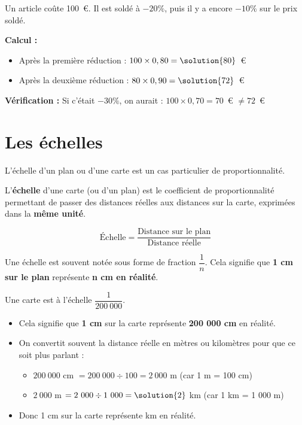 \begin{examplebox}
	Un article coûte 100~€. Il est soldé à $-20\%$, puis il y a encore $-10\%$ sur le prix soldé.

	\textbf{Calcul :}
	\begin{itemize}
		\item Après la première réduction : $100 \times 0,80 = \solution{80}$~€
		\item Après la deuxième réduction : $80 \times 0,90 = \solution{72}$~€
	\end{itemize}

	\textbf{Vérification :} Si c'était $-30\%$, on aurait : $100 \times 0,70 = 70$~€ $\neq 72$~€
\end{examplebox}

\seance

\section{Les échelles}

L'échelle d'un plan ou d'une carte est un cas particulier de proportionnalité.

\begin{definitionbox}[Échelle]
	L'\textbf{échelle} d'une carte (ou d'un plan) est le coefficient de proportionnalité permettant de passer des distances réelles aux distances sur la carte, exprimées dans la \textbf{même unité}.

	$$\text{Échelle} = \dfrac{\text{Distance sur le plan}}{\text{Distance réelle}}$$
\end{definitionbox}

\begin{remarkbox}
	Une échelle est souvent notée sous forme de fraction $\dfrac{1}{n}$.
	Cela signifie que \textbf{1 cm sur le plan} représente \textbf{n cm en réalité}.
\end{remarkbox}

\begin{examplebox}
	Une carte est à l'échelle $\dfrac{1}{200~000}$.
	\begin{itemize}
		\item Cela signifie que \textbf{1 cm} sur la carte représente \textbf{200 000 cm} en réalité.
		\item On convertit souvent la distance réelle en mètres ou kilomètres pour que ce soit plus parlant :
		\begin{itemize}
			\item $200~000$ cm $= 200~000 \div 100 = 2~000$ m (car 1 m = 100 cm)
			\item $2~000$ m $= 2~000 \div 1~000 = \solution{2}$ km (car 1 km = 1 000 m)
		\end{itemize}
		\item Donc 1 cm sur la carte représente  km en réalité.
	\end{itemize}
\end{examplebox}

